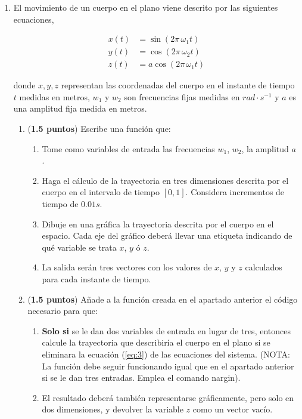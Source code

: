 \begin{enumerate}

\item  El movimiento de un cuerpo en el plano viene descrito por las siguientes ecuaciones,

\begin{align}
x(t) &= \sin(2 \pi \, \omega_1 t)\\
y(t) &= \cos(2 \pi \, \omega_2 t)\\
z(t) &= a\cos(2\pi \, \omega_1 t) \label{eq:3}
\end{align}

donde $x,y,z$ representan las coordenadas del cuerpo en el instante de tiempo $t$ medidas en metros,  $w_1$ y $w_2$ son frecuencias fijas medidas en $rad\cdot s^{-1}$ y $a$ es una amplitud fija medida en metros.

\begin{enumerate}
	\item \label{ap1} (\textbf{1.5 puntos}) Escribe una función que:

\begin{enumerate}
	\item Tome como variables de entrada las frecuencias $w_1$, $w_2$, la amplitud $a$ .
	\item Haga el cálculo de la trayectoria en tres dimensiones descrita por el cuerpo en el intervalo de tiempo $[0,1]$. Considera incrementos de tiempo de $0.01s$.
	\item Dibuje en una gráfica la trayectoria descrita por el cuerpo en el espacio. Cada eje del gráfico deberá llevar  una etiqueta indicando de qué variable se trata $x$, $y$ ó $z$.
	\item La salida serán tres vectores con los valores de $x$, $y$ y $z$ calculados para cada instante de tiempo.
	\end{enumerate}

\item (\textbf{1.5 puntos}) Añade a la función creada en el apartado anterior el código necesario para que:
	\begin{enumerate}
	\item \textbf{Solo si} se le dan dos variables de entrada en lugar de tres, entonces calcule la trayectoria que describiría el cuerpo en el plano si se eliminara la ecuación (\ref{eq:3}) de las ecuaciones del sistema. (NOTA: La función debe seguir funcionando igual que en el apartado anterior si se le dan tres entradas. Emplea el comando nargin).
	\item El resultado deberá también representarse gráficamente, pero solo en dos dimensiones, y devolver la variable $z$ como un vector vacío. 
	\end{enumerate}


\end{enumerate}
\end{enumerate}

